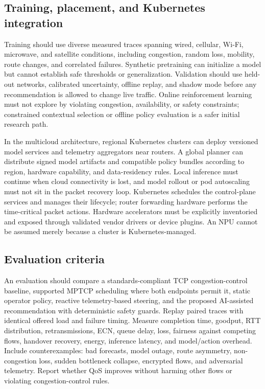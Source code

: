\documentclass[
  american,
  11pt,
]{article}
\begin{document}
\subsection{Training, placement, and Kubernetes
integration}\label{training-placement-and-kubernetes-integration}

Training should use diverse measured traces spanning wired, cellular,
Wi-Fi, microwave, and satellite conditions, including congestion, random
loss, mobility, route changes, and correlated failures. Synthetic
pretraining can initialize a model but cannot establish safe thresholds
or generalization. Validation should use held-out networks, calibrated
uncertainty, offline replay, and shadow mode before any recommendation
is allowed to change live traffic. Online reinforcement learning must
not explore by violating congestion, availability, or safety
constraints; constrained contextual selection or offline policy
evaluation is a safer initial research path.

In the multicloud architecture, regional Kubernetes clusters can deploy
versioned model services and telemetry aggregators near routers. A
global planner can distribute signed model artifacts and compatible
policy bundles according to region, hardware capability, and
data-residency rules. Local inference must continue when cloud
connectivity is lost, and model rollout or pod autoscaling must not sit
in the packet recovery loop. Kubernetes schedules the control-plane
services and manages their lifecycle; router forwarding hardware
performs the time-critical packet actions. Hardware accelerators must be
explicitly inventoried and exposed through validated vendor drivers or
device plugins. An NPU cannot be assumed merely because a cluster is
Kubernetes-managed.

\subsection{Evaluation criteria}\label{evaluation-criteria}

An evaluation should compare a standards-compliant TCP
congestion-control baseline, supported MPTCP scheduling where both
endpoints permit it, static operator policy, reactive telemetry-based
steering, and the proposed AI-assisted recommendation with deterministic
safety guards. Replay paired traces with identical offered load and
failure timing. Measure completion time, goodput, RTT distribution,
retransmissions, ECN, queue delay, loss, fairness against competing
flows, handover recovery, energy, inference latency, and model/action
overhead. Include counterexamples: bad forecasts, model outage, route
asymmetry, non-congestion loss, sudden bottleneck collapse, encrypted
flows, and adversarial telemetry. Report whether QoS improves without
harming other flows or violating congestion-control rules.
\end{document}
